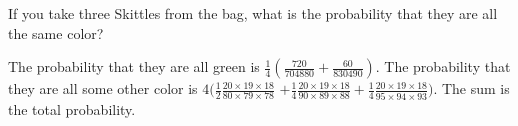 \documentclass[11pt]{article}
\begin{document}
\begin{Parts}
    \Part If you take three Skittles from the bag, what is the probability that they are all the same color?
    \begin{Answer}
        The probability that they are all green is $\frac{1}{4}(\frac{720}{704880} + \frac{60}{830490})$. 
        The probability that they are all some other color is $4(\frac{1}{2}\frac{20 \times 19 \times 18}{80 \times 79 \times 78}$
        $+ \frac{1}{4}\frac{20 \times 19 \times 18}{90 \times 89 \times 88} + \frac{1}{4}\frac{20 \times 19 \times 18}{95 \times 94 \times 93})$.
        The sum is the total probability. 
    \end{Answer}

\end{Parts}

\newpage
{}
\end{document}
